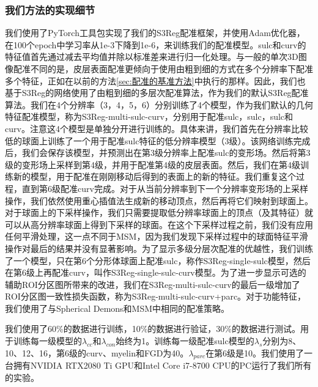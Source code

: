 \subsubsection{我们方法的实现细节}
我们使用了PyTorch\cite{paszke2017automatic}工具包实现了我们的S3Reg配准框架，并使用Adam优化器\cite{kingma2014adam}，在100个epoch中学习率从1e-3下降到1e-6，来训练我们的配准模型。sulc和curv的特征值首先通过减去平均值并除以标准差来进行归一化处理。与一般的单次3D图像配准不同的是，皮层表面配准更倾向于使用由粗到细的方式在多个分辨率下配准多个特征，正如在以前的方法\ref{sec:配准的基准方法}中执行的那样。因此，我们也基于S3Reg的网络使用了由粗到细的多层次配准算法，作为我们的默认S3Reg配准算法。我们在4个分辨率（3，4，5，6）分别训练了4个模型，作为我们默认的几何特征配准模型，称为S3Reg-multi-sulc-curv，分别用于配准sulc，sulc，sulc和curv。注意这4个模型是单独分开进行训练的。具体来讲，我们首先在分辨率比较低的球面上训练了一个用于配准sulc特征的低分辨率模型（3级）。该网络训练完成后，我们会保存该模型，并预测出在第3级分辨率上配准sulc的变形场。然后将第3级的变形场上采样到第4级，并用于配准第4级的皮层表面。然后，我们在第4级训练新的模型，用于配准在刚刚移动后得到的表面上的新的特征。我们重复这个过程，直到第6级配准curv完成。对于从当前分辨率到下一个分辨率变形场的上采样操作，我们依然使用重心插值法生成新的移动顶点，然后再将它们映射到球面上。对于球面上的下采样操作，我们只需要提取低分辨率球面上的顶点（及其特征）就可以从高分辨率球面上得到下采样的球面。在这个下采样过程之前，我们没有应用任何平滑处理，这一点不同于MSM\cite{robinson2014msm}，因为我们发现下采样过程中的球面特征平滑操作对最后的结果并没有显著影响。为了显示多级分层次配准的优越性，我们训练了一个模型，只在第6个分形体球面上配准sulc，称作S3Reg-single-sulc模型，然后在第6级上再配准curv，叫作S3Reg-single-sulc-curv模型。为了进一步显示可选的辅助ROI分区图所带来的改进，我们在S3Reg-multi-sulc-curv的最后一级增加了ROI分区图一致性损失函数，称为S3Reg-multi-sulc-curv+parc。对于功能特征，我们使用了与Spherical Demons和MSM中相同的配准策略。

我们使用了60\%的数据进行训练，10\%的数据进行验证，30\%的数据进行测试。用于训练每一级模型的$\lambda_{cc}$和$\lambda_{con}$始终为1。训练每一级配准sulc模型的$\lambda_s$分别为8、10、12、16，第6级的curv、myelin和FGD为40。$\lambda_{parc}$在第6级是10。我们使用了一台拥有NVIDIA RTX2080 Ti GPU和Intel Core i7-8700 CPU的PC运行了我们所有的实验。

